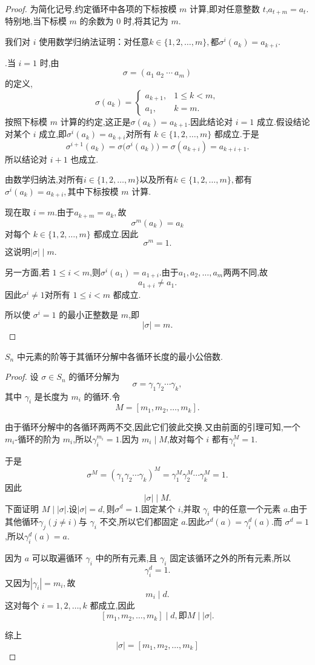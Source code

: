 \begin{proof}
	为简化记号,约定循环中各项的下标按模 $m$ 计算,即对任意整数 $t$,$a_{t+m}=a_t.$特别地,当下标模 $m$ 的余数为 $0$ 时,将其记为 $m$.
	
	我们对 $i$ 使用数学归纳法证明：对任意$k\in\{1,2,\ldots,m\},$都$\sigma^i(a_k)=a_{k+i}.$
	
	.当 $i=1$ 时,由
	\[
	\sigma=(a_1\ a_2\ \cdots\ a_m)
	\]
	的定义,
	\[
	\sigma(a_k)=
	\begin{cases}
		a_{k+1},&1\leq k<m,\\
		a_1,&k=m.
	\end{cases}
	\]
	按照下标模 $m$ 计算的约定,这正是$\sigma(a_k)=a_{k+1}.$因此结论对 $i=1$ 成立.假设结论对某个 $i$ 成立,即$\sigma^i(a_k)=a_{k+i}$对所有 $k\in\{1,2,\ldots,m\}$ 都成立.于是
	\[\sigma^{i+1}(a_k)=\sigma\bigl(\sigma^i(a_k)\bigr)=\sigma(a_{k+i})=a_{k+i+1}.\]
	所以结论对 $i+1$ 也成立.
	
	由数学归纳法,对所有$i\in\{1,2,\ldots,m\}$以及所有$k\in\{1,2,\ldots,m\},$都有$\sigma^i(a_k)=a_{k+i},$其中下标按模 $m$ 计算.
	
	现在取 $i=m$.由于$a_{k+m}=a_k,$故
	\[
	\sigma^m(a_k)=a_k
	\]
	对每个 $k\in\{1,2,\ldots,m\}$ 都成立.因此
	\[
	\sigma^m=1.
	\]
	这说明$|\sigma|\mid m.$

	另一方面,若 $1\leq i<m$,则$\sigma^i(a_1)=a_{1+i}.$由于$a_1,a_2,\ldots,a_m$两两不同,故
	\[
	a_{1+i}\neq a_1.
	\]
	因此$\sigma^i\neq 1$对所有 $1\leq i<m$ 都成立.
	
	所以使 $\sigma^i=1$ 的最小正整数是 $m$,即
	\[
	\boxed{|\sigma|=m}.
	\]
\end{proof}
\begin{proposition}
	$S_n$ 中元素的阶等于其循环分解中各循环长度的最小公倍数.
\end{proposition}

\begin{proof}
	设 $\sigma\in S_n$ 的循环分解为
	\[
	\sigma=\gamma_1\gamma_2\cdots\gamma_k,
	\]
	其中 $\gamma_i$ 是长度为 $m_i$ 的循环.令
	\[
	M=[m_1,m_2,\ldots,m_k].
	\]
	
	由于循环分解中的各循环两两不交,因此它们彼此交换.又由前面的引理可知,一个 $m_i$-循环的阶为 $m_i$,所以$\gamma_i^{m_i}=1.$因为 $m_i\mid M$,故对每个 $i$ 都有$\gamma_i^M=1.$

	于是
	\[\sigma^M
		=(\gamma_1\gamma_2\cdots\gamma_k)^M=\gamma_1^M\gamma_2^M\cdots\gamma_k^M=1.\]
	因此
	\[
	|\sigma|\mid M.
	\]
	下面证明 $M\mid |\sigma|$.设$|\sigma|=d,$则$\sigma^d=1.$固定某个 $i$,并取 $\gamma_i$ 中的任意一个元素 $a$.由于其他循环$\gamma_j (j\neq i)$与 $\gamma_i$ 不交,所以它们都固定 $a$.因此$\sigma^d(a)=\gamma_i^d(a).$而 $\sigma^d=1$,所以$\gamma_i^d(a)=a.$

	因为 $a$ 可以取遍循环 $\gamma_i$ 中的所有元素,且 $\gamma_i$ 固定该循环之外的所有元素,所以
	\[
	\gamma_i^d=1.
	\]
	又因为$|\gamma_i|=m_i,$故
	\[
	m_i\mid d.
	\]
	这对每个 $i=1,2,\ldots,k$ 都成立,因此
	\[
	[m_1,m_2,\ldots,m_k]\mid d,\text{即}M\mid |\sigma|.
	\]
	

	综上
	\[|\sigma|=[m_1,m_2,\ldots,m_k]
		\]
\end{proof}
